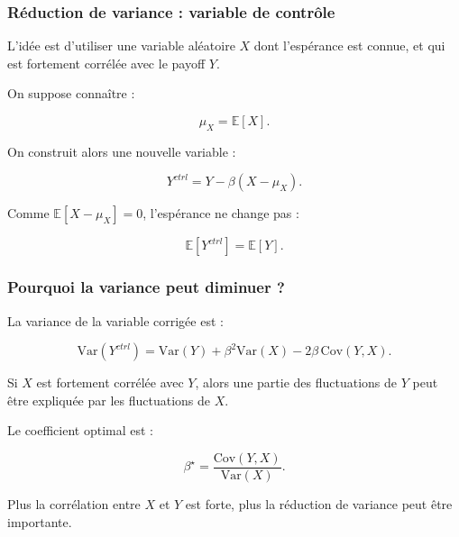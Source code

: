 \documentclass[aspectratio=169,11pt]{beamer}
\begin{document}
\begin{frame}
    \frametitle{Réduction de variance : variable de contrôle}

    L'idée est d'utiliser une variable aléatoire $X$ dont l'espérance
    est connue, et qui est fortement corrélée avec le payoff $Y$.

    \vspace{0.3cm}

    On suppose connaître :

    \[
        \mu_X = \mathbb{E}[X].
    \]

    \vspace{0.3cm}

    On construit alors une nouvelle variable :

    \[
        \boxed{
        Y^{ctrl}
        =
        Y
        -
        \beta
        \left(
            X-\mu_X
        \right).
        }
    \]

    \vspace{0.3cm}

    Comme $\mathbb{E}[X-\mu_X]=0$, l'espérance ne change pas :

    \[
        \mathbb{E}[Y^{ctrl}]
        =
        \mathbb{E}[Y].
    \]

\end{frame}

\begin{frame}
    \frametitle{Pourquoi la variance peut diminuer ?}

    La variance de la variable corrigée est :

    \[
        \mathrm{Var}(Y^{ctrl})
        =
        \mathrm{Var}(Y)
        +
        \beta^2\mathrm{Var}(X)
        -
        2\beta\,\mathrm{Cov}(Y,X).
    \]

    \vspace{0.35cm}

    Si $X$ est fortement corrélée avec $Y$, alors une partie des
    fluctuations de $Y$ peut être expliquée par les fluctuations de $X$.

    \vspace{0.35cm}

    Le coefficient optimal est :

    \[
        \boxed{
        \beta^\star
        =
        \frac{\mathrm{Cov}(Y,X)}
        {\mathrm{Var}(X)}.
        }
    \]

    \vspace{0.25cm}

    \centering
    \small
    Plus la corrélation entre $X$ et $Y$ est forte,
    plus la réduction de variance peut être importante.

\end{frame}
\end{document}
